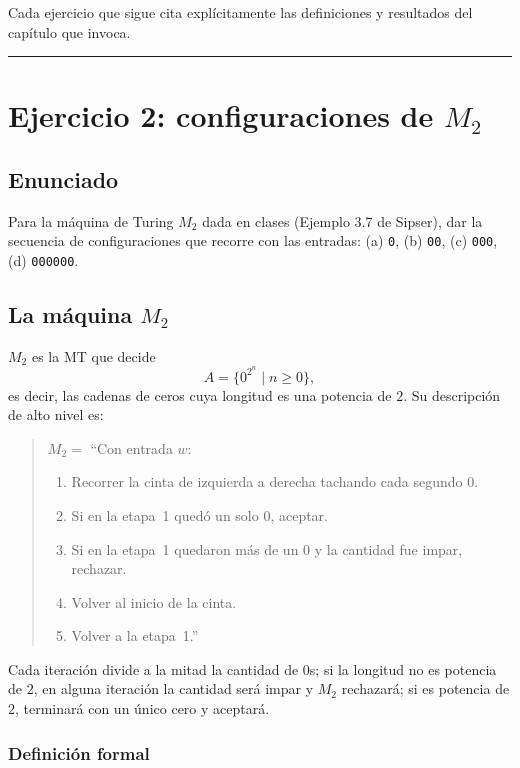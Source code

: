\documentclass[11pt,a4paper]{article}
\theoremstyle{plain}
\theoremstyle{definition}
\theoremstyle{remark}
\begin{document}
Cada ejercicio que sigue cita expl\'icitamente las definiciones y resultados
del cap\'itulo que invoca.

\bigskip\hrule\bigskip

\section{Ejercicio 2: configuraciones de $M_2$}
\label{sec:ej2}

\subsection*{Enunciado}

Para la m\'aquina de Turing $M_2$ dada en clases (Ejemplo 3.7 de Sipser),
dar la secuencia de configuraciones que recorre con las entradas:
(a) \texttt{0}, (b) \texttt{00}, (c) \texttt{000}, (d) \texttt{000000}.

\subsection*{La m\'aquina $M_2$}

$M_2$ es la MT que decide
\[
  A = \{0^{2^n}\mid n\ge 0\},
\]
es decir, las cadenas de ceros cuya longitud es una potencia de $2$. Su
descripci\'on de alto nivel es:

\begin{quote}
\(M_2=\) ``Con entrada $w$:
\begin{enumerate}
  \item Recorrer la cinta de izquierda a derecha tachando cada segundo $0$.
  \item Si en la etapa~1 qued\'o un solo $0$, aceptar.
  \item Si en la etapa~1 quedaron m\'as de un $0$ y la cantidad fue impar,
        rechazar.
  \item Volver al inicio de la cinta.
  \item Volver a la etapa~1.''
\end{enumerate}
\end{quote}

Cada iteraci\'on divide a la mitad la cantidad de $0$s; si la longitud no es
potencia de $2$, en alguna iteraci\'on la cantidad ser\'a impar y $M_2$
rechazar\'a; si es potencia de $2$, terminar\'a con un \'unico cero y
aceptar\'a.

\subsubsection*{Definici\'on formal}
\end{document}
